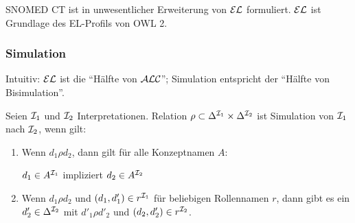 SNOMED CT ist in unwesentlicher Erweiterung von $\mathcal{E}\mathcal{L}$ formuliert. $\mathcal{E}\mathcal{L}$ ist Grundlage des EL-Profils von OWL 2.

\subsubsection{Simulation}\label{simulation}

Intuitiv: $\mathcal{E}\mathcal{L}$ ist die \enquote{Hälfte von $\mathcal{A}\mathcal{L}\mathcal{C}$}; Simulation entspricht der \enquote{Hälfte von Bisimulation}.

\begin{definition}[Simulation]
    Seien $\mathcal{I}_1$ und $\mathcal{I}_2$ Interpretationen. Relation $\rho \subset \Delta^{\mathcal{I}_1} \times \Delta^{\mathcal{I}_2}$ ist Simulation von $\mathcal{I}_1$ nach $\mathcal{I}_2$, wenn gilt:
    \begin{enumerate}
        \item Wenn $d_1 \rho d_2$, dann gilt für alle Konzeptnamen $A$:
            \begin{center}
                $d_1 \in A^{\mathcal{I}_1}$ impliziert $d_2 \in A^{\mathcal{I}_2}$
            \end{center}
        \item Wenn $d_1 \rho d_2$ und $(d_1, d'_1) \in r^{\mathcal{I}_1}$ für beliebigen Rollennamen $r$, dann gibt es ein $d'_2 \in \Delta^{\mathcal{I}_2}$ mit $d'_1 \rho d'_2$ und $(d_2, d'_2) \in r^{\mathcal{I}_2}$.
    \end{enumerate}
\end{definition}

